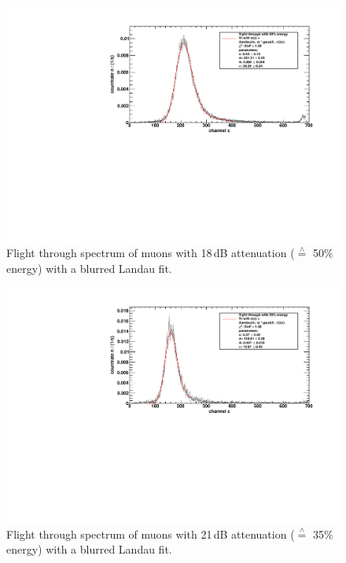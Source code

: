 \begin{figure}[H]
\begin{center}
  \includegraphics[width=\textwidth]{../img/energiekalibration_50.pdf}
  \caption{Flight through spectrum of muons with 18\,dB attenuation ($\overset{\wedge}{=}$ 50\% energy) with a blurred Landau fit.}
  \label{img:ecal:50}
\end{center}
\end{figure}

\begin{figure}[H]
\begin{center}
  \includegraphics[width=\textwidth]{../img/energiekalibration_35.pdf}
  \caption{Flight through spectrum of muons with 21\,dB attenuation ($\overset{\wedge}{=}$ 35\% energy) with a blurred Landau fit.}
  \label{img:ecal:35}
\end{center}
\end{figure}

